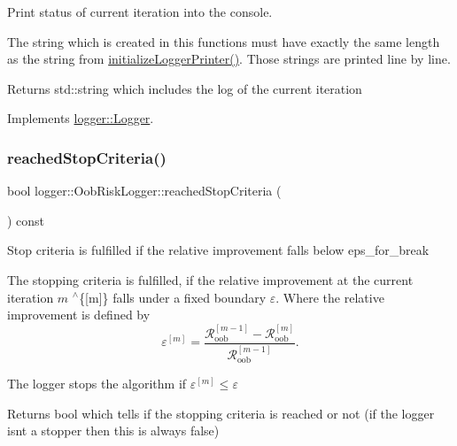 Print status of current iteration into the console. 

The string which is created in this functions must have exactly the same length as the string from {\ttfamily \mbox{\hyperlink{classlogger_1_1_oob_risk_logger_afb230d22eea9b1c025e6ff95685c692c}{initialize\+Logger\+Printer()}}}. Those strings are printed line by line.

\begin{DoxyReturn}{Returns}
{\ttfamily std\+::string} which includes the log of the current iteration 
\end{DoxyReturn}


Implements \mbox{\hyperlink{classlogger_1_1_logger_abad818a7e8053ca84cb267e883b5e377}{logger\+::\+Logger}}.

\mbox{\label{classlogger_1_1_oob_risk_logger_a5c1c8358ffcb5f5463b43f068ea21aa4}} 
\subsubsection{\texorpdfstring{reached\+Stop\+Criteria()}{reachedStopCriteria()}}
{\footnotesize\ttfamily bool logger\+::\+Oob\+Risk\+Logger\+::reached\+Stop\+Criteria (\begin{DoxyParamCaption}{ }\end{DoxyParamCaption}) const\hspace{0.3cm}{\ttfamily [virtual]}}



Stop criteria is fulfilled if the relative improvement falls below {\ttfamily eps\+\_\+for\+\_\+break} 

The stopping criteria is fulfilled, if the relative improvement at the current iteration $m$ $^\wedge$\{\mbox{[}m\mbox{]}\} falls under a fixed boundary $\varepsilon$. Where the relative improvement is defined by \[ \varepsilon^{[m]} = \frac{\mathcal{R}_\mathrm{oob}^{[m-1]} - \mathcal{R}_\mathrm{oob}^{[m]}}{\mathcal{R}_\mathrm{oob}^{[m-1]}}. \]

The logger stops the algorithm if $\varepsilon^{[m]} \leq \varepsilon$

\begin{DoxyReturn}{Returns}
{\ttfamily bool} which tells if the stopping criteria is reached or not (if the logger isn\textquotesingle{}t a stopper then this is always false) 
\end{DoxyReturn}



